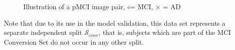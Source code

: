 \begin{figure}[h]
	\centering
	
	\caption{Illustration of a pMCI image pair, \Large$\circ$\normalsize\;= MCI, $\times$ = AD}
	\label{fig:pmci}
\end{figure}

Note that due to its use in the model validation, this data set represents a separate independent split $\mathcal{S}_{conv}$, that is, subjects which are part of the MCI Conversion Set do not occur in any other split.

